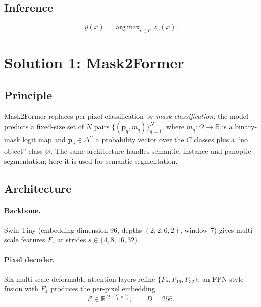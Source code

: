 \documentclass[11pt,a4paper]{article}
\newcommand{\R}{\mathbb{R}}
\newcommand{\1}{\mathbb{1}}
\newcommand{\nulc}{\varnothing}
\DeclareMathOperator*{\argmax}{arg\,max}
\begin{document}
\subsection{Inference}
\[
\hat y(x) = \argmax_{c\in\mathcal{C}} z_c(x).
\]

\section{Solution 1: Mask2Former}\label{sec:m2f}

\subsection{Principle}

Mask2Former \cite{cheng2022} replaces per-pixel classification by
\emph{mask classification}: the model predicts a fixed-size set of $N$ pairs
$\{(\bm p_q, m_q)\}_{q=1}^N$, where $m_q:\Omega\to\R$ is a binary-mask logit
map and $\bm p_q\in\Delta^{C}$ a probability vector over the $C$ classes plus a
``no object'' class $\nulc$. The same architecture handles semantic, instance
and panoptic segmentation; here it is used for semantic segmentation.

\subsection{Architecture}

\paragraph{Backbone.} Swin-Tiny \cite{liu2021} (embedding dimension 96,
depths $(2,2,6,2)$, window $7$) gives multi-scale features
$F_s$ at strides $s\in\{4,8,16,32\}$.

\paragraph{Pixel decoder.} Six multi-scale deformable-attention layers
\cite{zhu2021} refine $\{F_8,F_{16},F_{32}\}$; an FPN-style fusion with $F_4$
produces the per-pixel embedding
\[
\mathcal{E} \in \R^{D\times\frac H4\times\frac W4},\qquad D = 256 .
\]
\end{document}
